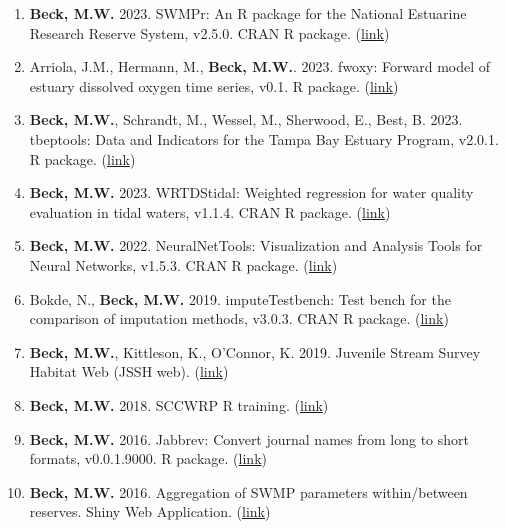 \documentclass[letterpaper,12pt]{article}
\begin{document}
\begin{enumerate}
\item \textbf{Beck, M.W.} 2023. SWMPr: An R package for the National Estuarine Research Reserve System, v2.5.0. CRAN R package. ({\footnotesize\href{http://fawda123.github.io/SWMPr}{link}})

\item Arriola, J.M., Hermann, M., \textbf{Beck, M.W.}. 2023. fwoxy: Forward model of estuary dissolved oxygen time series, v0.1. R package. ({\footnotesize\href{https://github.com/jmarriola/fwoxy}{link}}) 

\item \textbf{Beck, M.W.}, Schrandt, M., Wessel, M., Sherwood, E., Best, B. 2023. tbeptools: Data and Indicators for the Tampa Bay Estuary Program, v2.0.1. R package. ({\footnotesize\href{https://tbep-tech.github.io/tbeptools/}{link}})

\item \textbf{Beck, M.W.} 2023. WRTDStidal: Weighted regression for water quality evaluation in tidal waters, v1.1.4. CRAN R package. ({\footnotesize\href{https://cran.r-project.org/web/packages/WRTDStidal/index.html}{link}})

\item \textbf{Beck, M.W.} 2022. NeuralNetTools: Visualization and Analysis Tools for Neural Networks, v1.5.3. CRAN R package. ({\footnotesize\href{http://cran.r-project.org/web/packages/NeuralNetTools/}{link}})

\item Bokde, N., \textbf{Beck, M.W.} 2019. imputeTestbench: Test bench for the comparison of imputation methods, v3.0.3. CRAN R package. ({\footnotesize\href{https://cran.r-project.org/web/packages/imputeTestbench/index.html}{link}})

\item \textbf{Beck, M.W.}, Kittleson, K., O'Connor, K. 2019. Juvenile Stream Survey Habitat Web (JSSH web). ({\footnotesize\href{https://sccwrp.shinyapps.io/jssh_web/}{link}})

\item \textbf{Beck, M.W.} 2018. SCCWRP R training. ({\footnotesize\href{https://sccwrp.github.io/SCCWRP_R_training/}{link}})

\item \textbf{Beck, M.W.} 2016. Jabbrev: Convert journal names from long to short formats, v0.0.1.9000. R package. ({\footnotesize\href{https://github.com/fawda123/Jabbrev}{link}})

\item \textbf{Beck, M.W.} 2016. Aggregation of SWMP parameters within/between reserves. Shiny Web Application. ({\footnotesize\href{http://beckmw.shinyapps.io/swmp_agg}{link}})


\end{enumerate}
\end{document}
